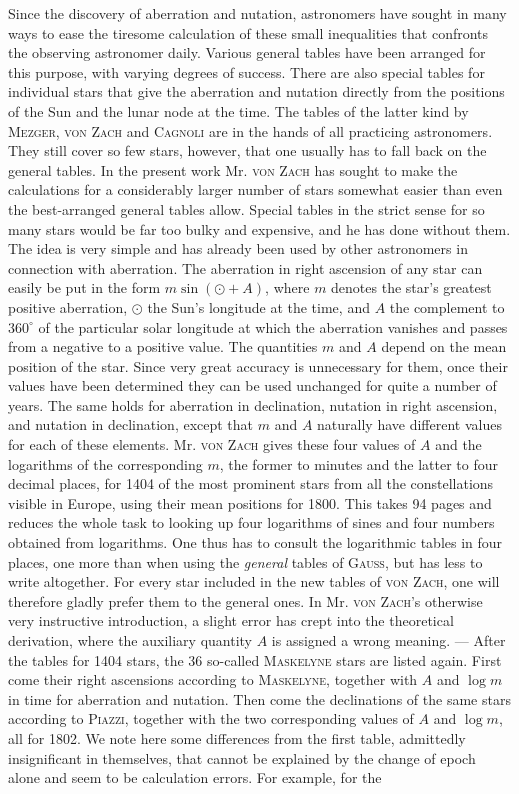 Since the discovery of aberration and nutation, astronomers have sought in many ways to ease the tiresome calculation of these small inequalities that confronts the observing astronomer daily. Various general tables have been arranged for this purpose, with varying degrees of success. There are also special tables for individual stars that give the aberration and nutation directly from the positions of the Sun and the lunar node at the time. The tables of the latter kind by \textsc{Mezger}, \textsc{von Zach} and \textsc{Cagnoli} are in the hands of all practicing astronomers. They still cover so few stars, however, that one usually has to fall back on the general tables. In the present work Mr. \textsc{von Zach} has sought to make the calculations for a considerably larger number of stars somewhat easier than even the best-arranged general tables allow. Special tables in the strict sense for so many stars would be far too bulky and expensive, and he has done without them. The idea is very simple and has already been used by other astronomers in connection with aberration. The aberration in right ascension of any star can easily be put in the form $m\sin(\odot+A)$, where $m$ denotes the star's greatest positive aberration, $\odot$ the Sun's longitude at the time, and $A$ the complement to $360^\circ$ of the particular solar longitude at which the aberration vanishes and passes from a negative to a positive value. The quantities $m$ and $A$ depend on the mean position of the star. Since very great accuracy is unnecessary for them, once their values have been determined they can be used unchanged for quite a number of years. The same holds for aberration in declination, nutation in right ascension, and nutation in declination, except that $m$ and $A$ naturally have different values for each of these elements. Mr. \textsc{von Zach} gives these four values of $A$ and the logarithms of the corresponding $m$, the former to minutes and the latter to four decimal places, for 1404 of the most prominent stars from all the constellations visible in Europe, using their mean positions for 1800. This takes 94 pages and reduces the whole task to looking up four logarithms of sines and four numbers obtained from logarithms. One thus has to consult the logarithmic tables in four places, one more than when using the \emph{general} tables of \textsc{Gauss}, but has less to write altogether. For every star included in the new tables of \textsc{von Zach}, one will therefore gladly prefer them to the general ones. In Mr. \textsc{von Zach}'s otherwise very instructive introduction, a slight error has crept into the theoretical derivation, where the auxiliary quantity $A$ is assigned a wrong meaning. --- After the tables for 1404 stars, the 36 so-called \textsc{Maskelyne} stars are listed again. First come their right ascensions according to \textsc{Maskelyne}, together with $A$ and $\log m$ in time for aberration and nutation. Then come the declinations of the same stars according to \textsc{Piazzi}, together with the two corresponding values of $A$ and $\log m$, all for 1802. We note here some differences from the first table, admittedly insignificant in themselves, that cannot be explained by the change of epoch alone and seem to be calculation errors. For example, for the 